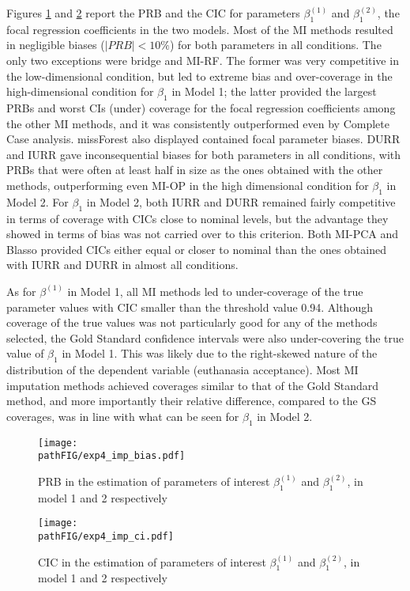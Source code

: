 	Figures \ref{fig:exp4bias} and \ref{fig:exp4ci} report the PRB and the CIC for parameters $\beta^{(1)}_{1}$ and 
	$\beta^{(2)}_{1}$, the focal regression coefficients in the two models.
	Most of the MI methods resulted in negligible biases ($|PRB| < 10\%$) for both parameters in all conditions.
	The only two exceptions were bridge and MI-RF. 
	The former was very competitive in the low-dimensional condition, but led to extreme bias and 
	over-coverage in the high-dimensional condition for $\beta_{1}$ in Model 1; 
	the latter provided the largest PRBs and worst CIs (under) coverage for the focal regression coefficients among 
	the other MI methods, and it was consistently outperformed even by Complete Case analysis.
	missForest also displayed contained focal parameter biases.
	DURR and IURR gave inconsequential biases for both parameters in all conditions, with PRBs that were
	often at least half in size as the ones obtained with the other methods, outperforming even MI-OP in the high 
	dimensional condition for $\beta_{1}$ in Model 2.
	For $\beta_{1}$ in Model 2, both IURR and DURR remained fairly competitive in terms of coverage 
	with CICs close to nominal levels, but the advantage they showed in terms of bias was not carried over to 
	this criterion.
	Both MI-PCA and Blasso provided CICs either equal or closer to nominal than the ones obtained with
	IURR and DURR in almost all conditions.

	As for $\beta^{(1)}$ in Model 1, all MI methods led to under-coverage of the true parameter values with CIC smaller 
	than the threshold value 0.94.
	Although coverage of the true values was not particularly good for any of the methods selected, the Gold Standard
	confidence intervals were also under-covering the true value of $\beta_{1}$ in Model 1.
	This was likely due to the right-skewed nature of the distribution of the dependent variable (euthanasia 
	acceptance).
	Most MI imputation methods achieved coverages similar to that of the Gold Standard method, and more importantly 
	their relative difference, compared to the GS coverages, was in line with what can be seen for $\beta_{1}$ in Model 2.

\begin{figure}[h]
	\centering
	\texttt{[image: \\pathFIG/exp4\_imp\_bias.pdf]}
	\caption{PRB in the estimation of parameters of interest $\beta^{(1)}_{1}$ and $\beta^{(2)}_{1}$, 
		in model 1 and 2 respectively}
	\label{fig:exp4bias}
\end{figure}

\begin{figure}[h]
	\centering
	\texttt{[image: \\pathFIG/exp4\_imp\_ci.pdf]}
	\caption{CIC in the estimation of parameters of interest $\beta^{(1)}_{1}$ and $\beta^{(2)}_{1}$, 
		in model 1 and 2 respectively}
	\label{fig:exp4ci}
\end{figure}

